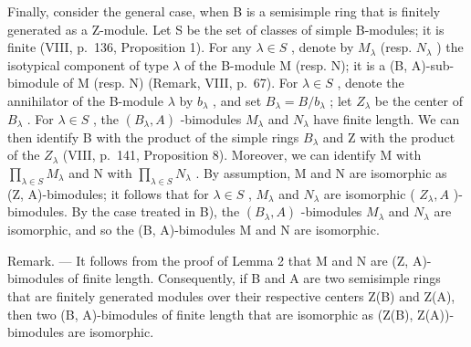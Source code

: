 \begin{enumerate}
  Finally, consider the general case, when B is a semisimple ring that is finitely generated as a Z-module. Let S be the set of classes of simple B-modules; it is finite (VIII, p.~136, Proposition 1). For any \(\lambda \in S\) , denote by \(M_{\lambda}\) (resp. \(N_{\lambda}\) ) the isotypical component of type \(\lambda\) of the B-module M (resp. N); it is a (B, A)-sub-bimodule of M (resp. N) (Remark, VIII, p.~67). For \(\lambda \in S\) , denote the annihilator of the B-module \(\lambda\) by \(b_{\lambda}\) , and set \(B_{\lambda} = B / b_{\lambda}\) ; let \(Z_{\lambda}\) be the center of \(B_{\lambda}\) . For \(\lambda \in S\) , the \((B_{\lambda}, A)\) -bimodules \(M_{\lambda}\) and \(N_{\lambda}\) have finite length. We can then identify B with the product of the simple rings \(B_{\lambda}\) and Z with the product of the \(Z_{\lambda}\) (VIII, p.~141, Proposition 8). Moreover, we can identify M with \(\prod_{\lambda \in S} M_{\lambda}\) and N with \(\prod_{\lambda \in S} N_{\lambda}\) . By assumption, M and N are isomorphic as (Z, A)-bimodules; it follows that for \(\lambda \in S\) , \(M_{\lambda}\) and \(N_{\lambda}\) are isomorphic ( \(Z_{\lambda}, A\) )-bimodules. By the case treated in B), the \((B_{\lambda}, A)\) -bimodules \(M_{\lambda}\) and \(N_{\lambda}\) are isomorphic, and so the (B, A)-bimodules M and N are isomorphic.
\end{enumerate}

Remark. --- It follows from the proof of Lemma 2 that M and N are (Z, A)-bimodules of finite length. Consequently, if B and A are two semisimple rings that are finitely generated modules over their respective centers Z(B) and Z(A), then two (B, A)-bimodules of finite length that are isomorphic as (Z(B), Z(A))-bimodules are isomorphic.

